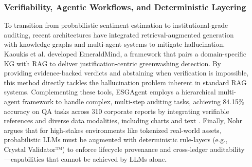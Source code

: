 \documentclass{article}
\begin{document}
\subsubsection{Verifiability, Agentic Workflows, and Deterministic Layering}

To transition from probabilistic sentiment estimation to institutional-grade auditing, recent architectures have integrated retrieval-augmented generation with knowledge graphs and multi-agent systems to mitigate hallucination. Kaoukis et al.  \parencite{kaoukis__georgios_35bab107} developed EmeraldMind, a framework that pairs a domain-specific KG with RAG to deliver justification-centric greenwashing detection. By providing evidence-backed verdicts and abstaining when verification is impossible, this method directly tackles the hallucination problem inherent in standard RAG systems. Complementing these tools, ESGAgent  \parencite{yilei_zhao_b7bbd9c8} employs a hierarchical multi-agent framework to handle complex, multi-step auditing tasks, achieving 84.15\% accuracy on QA tasks across 310 corporate reports by integrating verifiable references and diverse data modalities, including charts and text  \parencite{yilei_zhao_b7bbd9c8}. Finally, Nohr  \parencite{steven_paul_nohr_a6874924} argues that for high-stakes environments like tokenized real-world assets, probabilistic LLMs must be augmented with deterministic rule-layers (e.g., Crystal Validator™) to enforce lifecycle provenance and cross-ledger auditability—capabilities that cannot be achieved by LLMs alone.
\end{document}
